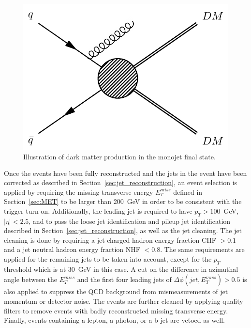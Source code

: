 \begin{figure}[ht]
  \centering
 \includegraphics[width=.4\textwidth]{monojet.png} 
 \caption{Illustration of dark matter production in the monojet final state.}
 \label{fig:monojet_diagram}
\end{figure}

Once the events have been fully reconstructed and the jets in the event have been corrected as described in Section~\ref{sec:jet_reconstruction}, an event selection is applied by requiring the missing transverse energy $E_T^{miss}$ defined in Section~\ref{sec:MET} to be larger than 200~GeV in order to be consistent with the trigger turn-on. Additionally, the leading jet is required to have $p_T > 100$~GeV, $|\eta| < 2.5$, and to pass the loose jet identification and pileup jet identification described in Section~\ref{sec:jet_reconstruction}, as well as the jet cleaning.  The jet cleaning is done by requiring a jet charged hadron energy fraction CHF $> 0.1$ and a jet neutral hadron energy fraction NHF $< 0.8$. The same requirements are applied for the remaining jets to be taken into account, except for the $p_T$ threshold which is at 30~GeV in this case. A cut on the difference in azimuthal angle between the $E_T^{miss}$ and the first four leading jets of $\Delta\phi(jet, E_T^{miss}) > 0.5$ is also applied to suppress the QCD background from mismeasurements of jet momentum or detector noise. The events are further cleaned by applying quality filters to remove events with badly reconstructed missing transverse energy. Finally, events containing a lepton, a photon, or a b-jet are vetoed as well.

